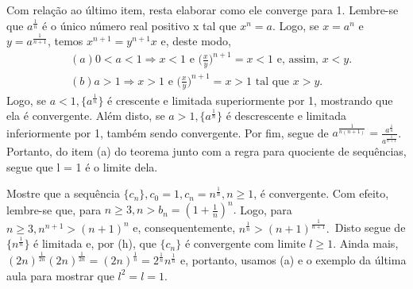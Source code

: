 \documentclass[analysis_notes.tex]{subfiles}
\begin{document}
\begin{example}
	Com rela\c c\~ao ao \'ultimo item, resta elaborar como ele converge para 1. Lembre-se que $a^{\frac{1}{n}}$ \'e o \'unico n\'umero real positivo
	x tal que $x^{n} = a.$ Logo, se $x = a^{n} $ e $y = a^{\frac{1}{n+1}}$, temos $x^{n+1} = y^{n+1}x$ e, deste modo,
	\begin{align*}
		 & (a) 0 < a < 1 \Rightarrow x < 1 \text{ e } \biggl(\frac{x}{y}\biggr)^{n+1} = x < 1\text{ e, assim, } x < y. \\
		 & (b) a > 1 \Rightarrow x > 1\text{ e }\biggl(\frac{x}{y}\biggr)^{n+1} = x > 1\text{ tal que } x > y.
	\end{align*}
	Logo, se $a < 1,\{a^{\frac{1}{n}}\} $ \'e crescente e limitada superiormente por 1, mostrando que ela \'e convergente. Al\'em disto,
	se $a > 1,\{a^{\frac{1}{n}}\} $ \'e descrescente e limitada inferiormente por 1, tamb\'em sendo convergente. Por fim, segue de
	$a^{\frac{1}{n(n+1)}} = \frac{a^{\frac{1}{n}}}{a^{\frac{1}{n+1}}}$. Portanto, do item (a) do teorema junto com a regra para quociente de
	sequ\^encias, segue que l = 1 \'e o limite dela.
\end{example}\begin{example}
	Mostre que a sequ\^encia $\{c_{n}\}, c_{0} = 1, c_{n} = n^{\frac{1}{n}}, n\geq{1}$, \'e convergente. Com efeito, lembre-se que,
	para $n\geq{3}, n > b_{n} = (1+\frac{1}{n})^{n}.$ Logo, para $n\geq{3}, n^{n+1}>(n+1)^{n}$ e, consequentemente, $n^{\frac{1}{n}} > (n+1)^{\frac{1}{n+1}}.$\
	Disto segue de $\{n^{\frac{1}{n}}\} $ \'e limitada e, por (h), que $\{c_{n}\} $ \'e convergente com limite $l\geq{1}.$ Ainda mais,
	$(2n)^{\frac{1}{2n}}(2n)^{\frac{1}{2n}} = (2n)^{\frac{1}{n}} = 2^{\frac{1}{n}}n^{\frac{1}{n}}$ e, portanto, usamos (a) e o exemplo da \'ultima aula para
	mostrar que $l^{2} = l = 1.$\qedsymbol
\end{example}
\end{document}
